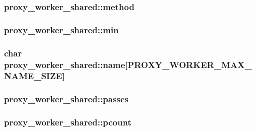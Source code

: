 \subsubsection[{\texorpdfstring{method}{method}}]{ proxy\+\_\+worker\+\_\+shared\+::method}\hypertarget{structproxy__worker__shared_a2a36171f268b948bbefe3743cf4e867f}{}\label{structproxy__worker__shared_a2a36171f268b948bbefe3743cf4e867f}
\subsubsection[{\texorpdfstring{min}{min}}]{ proxy\+\_\+worker\+\_\+shared\+::min}\hypertarget{structproxy__worker__shared_ae513fb822a1ea5a6dc2a31d0ad9046db}{}\label{structproxy__worker__shared_ae513fb822a1ea5a6dc2a31d0ad9046db}
\subsubsection[{\texorpdfstring{name}{name}}]{\setlength{\rightskip}{0pt plus 5cm}char proxy\+\_\+worker\+\_\+shared\+::name\mbox{[}{\bf P\+R\+O\+X\+Y\+\_\+\+W\+O\+R\+K\+E\+R\+\_\+\+M\+A\+X\+\_\+\+N\+A\+M\+E\+\_\+\+S\+I\+ZE}\mbox{]}}\hypertarget{structproxy__worker__shared_a5cc7bac10e746c287d81e723ddd5bad4}{}\label{structproxy__worker__shared_a5cc7bac10e746c287d81e723ddd5bad4}
\subsubsection[{\texorpdfstring{passes}{passes}}]{ proxy\+\_\+worker\+\_\+shared\+::passes}\hypertarget{structproxy__worker__shared_adffcf8cafb074dc8260d3280c59640cd}{}\label{structproxy__worker__shared_adffcf8cafb074dc8260d3280c59640cd}
\subsubsection[{\texorpdfstring{pcount}{pcount}}]{ proxy\+\_\+worker\+\_\+shared\+::pcount}\hypertarget{structproxy__worker__shared_a38d26d44851c365440b93389835b7543}{}\label{structproxy__worker__shared_a38d26d44851c365440b93389835b7543}
